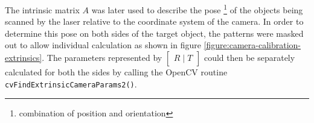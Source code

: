 The intrinsic matrix $A$ was later used to describe the pose
\footnote{combination of position and orientation} of the objects being
scanned by the laser relative to the coordinate system of the camera. In order
to determine this pose on both sides of the target object, the patterns were
masked out to allow individual calculation as shown in figure
\ref{figure:camera-calibration-extrinsics}. The parameters represented by
$\begin{bmatrix}R \mid T\end{bmatrix}$ could then be separately calculated for
both the sides by calling the OpenCV routine
\texttt{cvFindExtrinsicCameraParams2()}.


